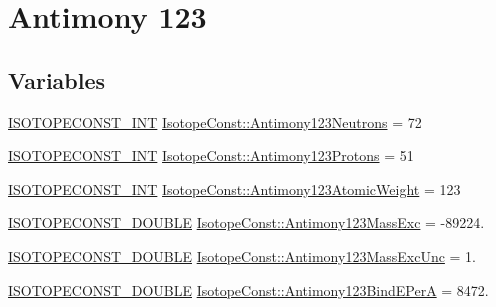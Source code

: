 \hypertarget{group___isotope_const-_antimony-_sb123}{}\section{Antimony 123}
\label{group___isotope_const-_antimony-_sb123}
\subsection*{Variables}
\begin{DoxyCompactItemize}
\item 
\mbox{\hyperlink{group___isotope_const-_macros_ga5f18360b3e99483a35c32d789e62621c}{I\+S\+O\+T\+O\+P\+E\+C\+O\+N\+S\+T\+\_\+\+I\+NT}} \mbox{\hyperlink{group___isotope_const-_antimony-_sb123_gab30bfcec04258db8244bfe3f6dc22196}{Isotope\+Const\+::\+Antimony123\+Neutrons}} = 72
\item 
\mbox{\hyperlink{group___isotope_const-_macros_ga5f18360b3e99483a35c32d789e62621c}{I\+S\+O\+T\+O\+P\+E\+C\+O\+N\+S\+T\+\_\+\+I\+NT}} \mbox{\hyperlink{group___isotope_const-_antimony-_sb123_ga9a8ef937b92f03f605963370e338c90e}{Isotope\+Const\+::\+Antimony123\+Protons}} = 51
\item 
\mbox{\hyperlink{group___isotope_const-_macros_ga5f18360b3e99483a35c32d789e62621c}{I\+S\+O\+T\+O\+P\+E\+C\+O\+N\+S\+T\+\_\+\+I\+NT}} \mbox{\hyperlink{group___isotope_const-_antimony-_sb123_gac6703b38c97c950eb1b22b47849379ca}{Isotope\+Const\+::\+Antimony123\+Atomic\+Weight}} = 123
\item 
\mbox{\hyperlink{group___isotope_const-_macros_ga8f45a7272ce02c0b4c65c44636ed719a}{I\+S\+O\+T\+O\+P\+E\+C\+O\+N\+S\+T\+\_\+\+D\+O\+U\+B\+LE}} \mbox{\hyperlink{group___isotope_const-_antimony-_sb123_ga984556368604ab0c39ed43709fe9cb3b}{Isotope\+Const\+::\+Antimony123\+Mass\+Exc}} = -\/89224.
\item 
\mbox{\hyperlink{group___isotope_const-_macros_ga8f45a7272ce02c0b4c65c44636ed719a}{I\+S\+O\+T\+O\+P\+E\+C\+O\+N\+S\+T\+\_\+\+D\+O\+U\+B\+LE}} \mbox{\hyperlink{group___isotope_const-_antimony-_sb123_gafe64e53ce1b2299badf7cff8e15a7d21}{Isotope\+Const\+::\+Antimony123\+Mass\+Exc\+Unc}} = 1.
\item 
\mbox{\hyperlink{group___isotope_const-_macros_ga8f45a7272ce02c0b4c65c44636ed719a}{I\+S\+O\+T\+O\+P\+E\+C\+O\+N\+S\+T\+\_\+\+D\+O\+U\+B\+LE}} \mbox{\hyperlink{group___isotope_const-_antimony-_sb123_ga29dd7245b40c4ac58e690565c0a25b67}{Isotope\+Const\+::\+Antimony123\+Bind\+E\+PerA}} = 8472.
\item 

\end{DoxyCompactItemize}
